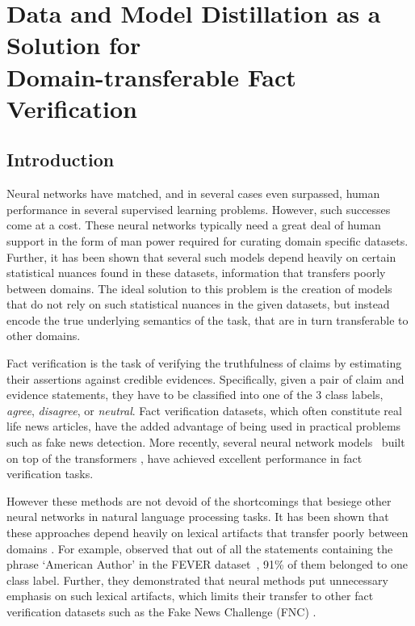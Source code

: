 
\chapter{Data and Model Distillation as a Solution for\\Domain-transferable Fact Verification \label{chapter:naacl21}}

\section{Introduction}

Neural networks have matched, and in several cases even surpassed, human performance in several supervised learning problems. However, such successes come at a cost. These neural networks typically need a great deal of human support in the form of man power required for curating domain specific datasets. Further, it has been shown \cite{gururangan-etal-2018-annotation, poliak-etal-2018-hypothesis,thorne2020avoiding} that several such models depend heavily on certain statistical nuances found in these datasets, information that transfers poorly between domains. The ideal solution to this problem is the creation of models that do not rely on such statistical nuances in the given datasets, but instead encode the true underlying semantics of the task, that are in turn transferable to other domains.



Fact verification is the task of verifying the truthfulness of claims by estimating their assertions against credible evidences. Specifically, given a pair of claim and evidence statements, they have to be classified into one of the 3 class labels, \textit{agree}, \textit{disagree}, or \textit{neutral}. Fact verification datasets, which often constitute real life news articles, have the added advantage of being used in practical problems such as fake news detection. More recently, several neural network models~\cite[inter alia]{nie-etal-2020-simple,liu-etal-2020-microsoft} built on top of the transformers \citep{vaswani2017attention}, have achieved excellent performance in fact verification tasks.

However these methods are not devoid of the shortcomings that besiege other neural networks in natural language processing tasks. It has been shown that these approaches depend heavily on lexical artifacts that transfer poorly between domains \cite{panenghat2020towards,karimi-mahabadi-etal-2020-end,schuster-etal-2019-towards}. For example, \citet{suntwal-etal-2019-importance} observed that out of all the statements containing the phrase `American Author' in  the FEVER dataset~\citep{thorne-etal-2018-fact}, 91\% of them belonged to one class label. Further, they demonstrated that neural methods put unnecessary emphasis on such lexical artifacts, which limits their transfer to other fact verification datasets such as the Fake News Challenge (FNC) \citep{pomerleau2017fake}.


